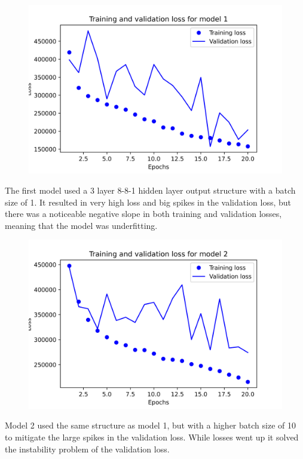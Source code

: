 \documentclass{article}
\begin{document}
    \begin{figure}[H]
        \includegraphics[width=\linewidth]{images/model1.png}
    \end{figure}
    The first model used a 3 layer 8-8-1 hidden layer output structure with a batch size of 1.
    It resulted in very high loss and big spikes in the validation loss, but there was a noticeable 
    negative slope in both training and validation losses, meaning that the model was underfitting.
    
    \begin{figure}[H]
        \includegraphics[width=\linewidth]{images/model2.png}
    \end{figure}
    Model 2 used the same structure as model 1, but with a higher batch size of 10 to mitigate the large spikes in the validation loss. While 
    losses went up it solved the instability problem of the validation loss.
\end{document}
